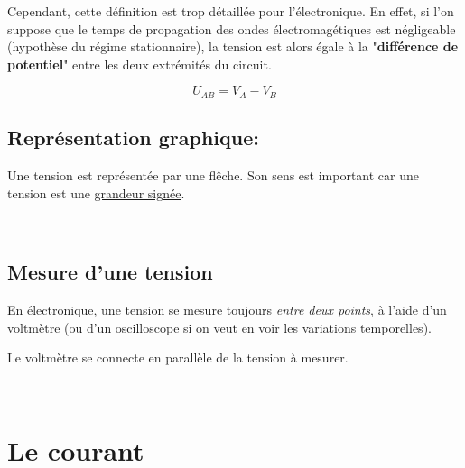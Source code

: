 Cependant, cette définition est trop détaillée pour l'électronique. En effet, si l'on suppose que le temps de propagation des ondes électromagétiques est négligeable (hypothèse du régime stationnaire), la tension est alors égale à la "\textbf{différence de potentiel}" entre les deux extrémités du circuit.

\begin{equation}
	U_{AB} = V_A - V_B
\end{equation}


\subsection*{Représentation graphique: }

\begin{minipage}{7cm}
\begin{center}

\end{center}
\end{minipage}
\hspace{1cm}
\begin{minipage}{7cm}
Une tension est représentée par une flêche. Son sens est important car une tension est une \underline{grandeur signée}. 
\end{minipage}\\

\subsection*{Mesure d'une tension}

En électronique, une tension se mesure toujours \emph{entre deux points}, à l'aide d'un voltmètre (ou d'un oscilloscope si on veut en voir les variations temporelles). \\


\begin{minipage}{7cm}
\begin{center}

\end{center}
\end{minipage}
\hspace{1cm}
\begin{minipage}{7cm} 
	Le voltmètre se connecte en parallèle de la tension à mesurer. 
\end{minipage}\\

\section{Le courant}

